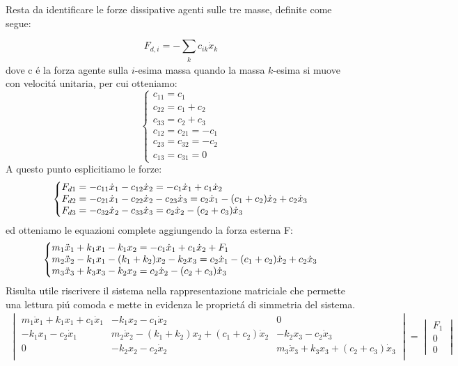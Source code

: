 \documentclass[12pt,a4paper]{article}
\makeatletter
\newenvironment{sistema}%
  {\left\lbrace\begin{array}{@{}l@{}}}%
  {\end{array}\right.}
\makeatother
\begin{document}
 		Resta da identificare le forze dissipative agenti sulle tre masse, definite come segue:
 		
		\begin{equation}
 			F_{ d,i} = - \sum_{\substack{k}} c_{ik} \dot{x}_k
 		\end{equation}
 		dove c \'e la forza agente sulla $i$-esima massa quando la massa $k$-esima si muove con velocit\'a unitaria, per cui otteniamo:
		\[
 		\begin{cases}
 		
		c_{11} = c_{1}
		\\
		c_{22} = c_{1} + c_{2}
		\\
		c_{33} = c_{2} + c_{3}
		\\
		c_{12} = c_{21} = - c_{1}
		\\
		c_{23} = c_{32} = - c_{2}
		\\
		c_{13} = c_{31} = 0
		
		\end{cases}
 		\]
		A questo punto esplicitiamo le forze:
		\[
		\begin {sistema}
		
		F_{d1} = - c_{11}\dot x_1 - c_{12}\dot x_2 = -c_1 \dot x_1 + c_1 \dot x_2
		\\
		F_{d2} = - c_{21}\dot x_1 - c_{22}\dot x_2 - c_{23}\dot x_3 = c_2  \dot x_1  - (c_1 + c_2) \dot x_2 + c_2\dot x_3
		\\
		F_{d3} = - c_{32}\dot x_2 - c_{33}\dot x_3 = c_2 \dot x_2 - (c_2 + c_3) \dot x_3
		
		\end{sistema}
		\]
 		ed otteniamo le equazioni complete aggiungendo la forza esterna F:
		\[
		\begin {sistema}
		
		m_1 \ddot{x}_1 + k_1x_1 - k_1 x_2  =  -c_1 \dot x_1 + c_1 \dot x_2 +F_1
		\\
		m_2 \ddot{x}_2 - k_1 x_1 - (k_1 +k_2 )x_2 - k_2 x_3 = c_2  \dot x_1  - (c_1 + c_2) \dot x_2 + c_2\dot x_3
		\\
		m_3 \ddot{x}_3 + k_3 x_3 -k_2 x_2= c_2 \dot x_2 - (c_2 + c_3) \dot x_3
		
		\end{sistema}
		\]
		Risulta utile riscrivere il sistema nella rappresentazione matriciale che permette una lettura pi\'u comoda e mette in evidenza le propriet\'a di simmetria del sistema.
		\begin {gather}
		\begin{vmatrix}
		m_1 \ddot{x}_1 + k_1x_1	+ c_1 \dot x_1	&  		- k_1 x_2	- c_1 \dot x_2 		&	0 \\
		- k_1 x_1 - c_2  \dot x_1 				&  	m_2 \ddot{x}_2	- (k_1 +k_2 )x_2 +(c_1 + c_2) \dot x_2	&	- k_2 x_3 - c_2\dot x_3 \\
		0	&  	-k_2 x_2 - c_2 \dot x_2		&m_3 \ddot{x}_3 + k_3 x_3 +(c_2 + c_3) \dot x_3	 \\
		\end{vmatrix}
		=
		\begin{vmatrix}
		F_1
		\\
		0
		\\
		0
		\end{vmatrix}
		\end{gather}
		
		
 
 
 
\end{document}

